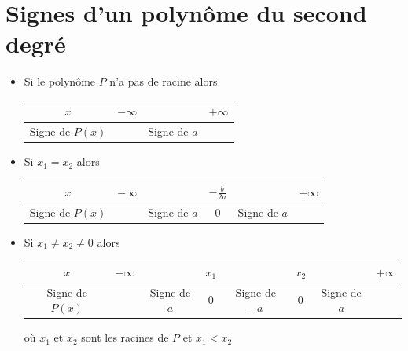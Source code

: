 \documentclass[french]{book}
\begin{document}
\section{Signes d'un polynôme du second degré}
\begin{prop}
\begin{itemize}
\item Si le polynôme $P$ n'a pas de racine alors 

\vspace{1ex}

\begin{tabular}[c]{|c|ccc|} \hline
$x$ & $-\infty$ &  & $+\infty$ \\ \hline
Signe de $P(x)$ &  & Signe de $a$ & \\ \hline
\end{tabular}

\item Si $x_1=x_2$ alors 
\vspace{1ex}

\begin{tabular}[c]{|c|ccccc|} \hline
$x$ & $-\infty$ &  & $-\frac{b}{2a}$ &  & $+\infty$ \\ \hline
Signe de $P(x)$ &  & Signe de $a$ & $0$ & Signe de $a$ & \\ \hline
\end{tabular}


\item Si $x_1 \neq x_2 \neq 0$ alors

\vspace{1ex}

\begin{tabular}[c]{|c|ccccccc|} \hline
$x$ & $-\infty$ &  & $x_{1}$ &  & $x_{2}$ &  & $+\infty$ \\ \hline
Signe de $P(x)$ &  & Signe de $a$ & $0$ & Signe de $-a$ & $0$ & Signe de $a$ & \\ \hline
\end{tabular}

\vspace{1ex}

\hspace*{1cm}où $x_{1}$ et $x_{2}$ sont les racines de $P$ et $x_{1}<x_{2}$
\end{itemize}
\end{prop}

\end{document}
